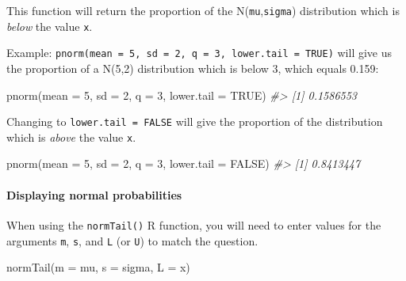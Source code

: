 \documentclass[
]{report}
\newenvironment{Shaded}{\begin{snugshade}}{\end{snugshade}}
\newcommand{\AttributeTok}[1]{\textcolor[rgb]{0.77,0.63,0.00}{#1}}
\newcommand{\CommentTok}[1]{\textcolor[rgb]{0.56,0.35,0.01}{\textit{#1}}}
\newcommand{\ConstantTok}[1]{\textcolor[rgb]{0.00,0.00,0.00}{#1}}
\newcommand{\DecValTok}[1]{\textcolor[rgb]{0.00,0.00,0.81}{#1}}
\newcommand{\FunctionTok}[1]{\textcolor[rgb]{0.00,0.00,0.00}{#1}}
\newcommand{\NormalTok}[1]{#1}
\begin{document}
This function will return the proportion of the N(\texttt{mu},\texttt{sigma}) distribution which is \emph{below} the value \texttt{x}.

Example: \texttt{pnorm(mean\ =\ 5,\ sd\ =\ 2,\ q\ =\ 3,\ lower.tail\ =\ TRUE)} will give us the proportion of a N(5,2) distribution which is below 3, which equals 0.159:

\begin{Shaded}
\begin{Highlighting}[]
\FunctionTok{pnorm}\NormalTok{(}\AttributeTok{mean =} \DecValTok{5}\NormalTok{, }\AttributeTok{sd =} \DecValTok{2}\NormalTok{, }\AttributeTok{q =} \DecValTok{3}\NormalTok{, }\AttributeTok{lower.tail =} \ConstantTok{TRUE}\NormalTok{)}
\CommentTok{\#\textgreater{} [1] 0.1586553}
\end{Highlighting}
\end{Shaded}

Changing to \texttt{lower.tail\ =\ FALSE} will give the proportion of the distribution which is \emph{above} the value \texttt{x}.

\begin{Shaded}
\begin{Highlighting}[]
\FunctionTok{pnorm}\NormalTok{(}\AttributeTok{mean =} \DecValTok{5}\NormalTok{, }\AttributeTok{sd =} \DecValTok{2}\NormalTok{, }\AttributeTok{q =} \DecValTok{3}\NormalTok{, }\AttributeTok{lower.tail =} \ConstantTok{FALSE}\NormalTok{)}
\CommentTok{\#\textgreater{} [1] 0.8413447}
\end{Highlighting}
\end{Shaded}

\hypertarget{displaying-normal-probabilities}{%
\paragraph*{Displaying normal probabilities}\label{displaying-normal-probabilities}}

When using the \texttt{normTail()} R function, you will need to enter values for the arguments \texttt{m}, \texttt{s}, and \texttt{L} (or \texttt{U}) to match the question.

\begin{Shaded}
\begin{Highlighting}[]
\FunctionTok{normTail}\NormalTok{(}\AttributeTok{m =}\NormalTok{ mu, }\AttributeTok{s =}\NormalTok{ sigma, }\AttributeTok{L =}\NormalTok{ x)}
\end{Highlighting}
\end{Shaded}
\end{document}
